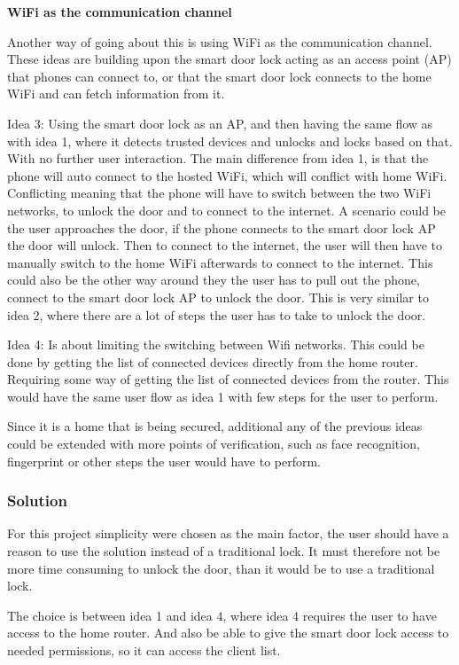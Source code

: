 \textbf{WiFi as the communication channel}

Another way of going about this is using WiFi as the communication channel.
These ideas are building upon the smart door lock acting as an access point (AP) that phones can connect to, or that the smart door lock connects to the home WiFi and can fetch information from it.

Idea 3: Using the smart door lock as an AP, and then having the same flow as with idea 1, where it detects trusted devices and unlocks and locks based on that. With no further user interaction.
The main difference from idea 1, is that the phone will auto connect to the hosted WiFi, which will conflict with home WiFi.
Conflicting meaning that the phone will have to switch between the two WiFi networks, to unlock the door and to connect to the internet.
A scenario could be the user approaches the door, if the phone connects to the smart door lock AP the door will unlock.
Then to connect to the internet, the user will then have to manually switch to the home WiFi afterwards to connect to the internet.
This could also be the other way around they the user has to pull out the phone, connect to the smart door lock AP to unlock the door.
This is very similar to idea 2, where there are a lot of steps the user has to take to unlock the door.

Idea 4: Is about limiting the switching between Wifi networks.
This could be done by getting the list of connected devices directly from the home router.
Requiring some way of getting the list of connected devices from the router.
This would have the same user flow as idea 1 with few steps for the user to perform.

Since it is a home that is being secured, additional any of the previous ideas could be extended with more points of verification, such as face recognition, fingerprint or other steps the user would have to perform.

\subsubsection{Solution}
For this project simplicity were chosen as the main factor, the user should have a reason to use the solution instead of a traditional lock.
It must therefore not be more time consuming to unlock the door, than it would be to use a traditional lock.

The choice is between idea 1 and idea 4, where idea 4 requires the user to have access to the home router.
And also be able to give the smart door lock access to needed permissions, so it can access the client list.

